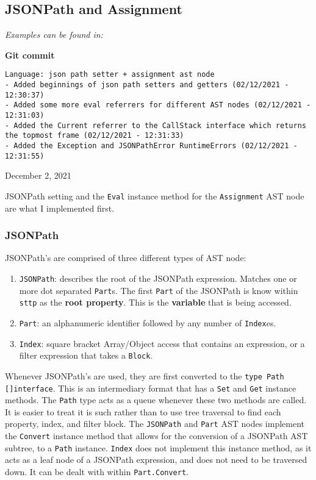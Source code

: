 \subsection{JSONPath and Assignment}

\textit{Examples can be found in: }

\begin{center}
    \textbf{Git commit}
    \begin{verbatim}
Language: json path setter + assignment ast node
- Added beginnings of json path setters and getters (02/12/2021 - 12:30:37)
- Added some more eval referrers for different AST nodes (02/12/2021 - 12:31:03)
- Added the Current referrer to the CallStack interface which returns the topmost frame (02/12/2021 - 12:31:33)
- Added the Exception and JSONPathError RuntimeErrors (02/12/2021 - 12:31:55)
    \end{verbatim}
    \vspace{-1em}
    \tiny{December 2, 2021}
\end{center}

JSONPath setting and the \verb|Eval| instance method for the \verb|Assignment| AST node are what I implemented first.

\subsubsection{JSONPath}

JSONPath's are comprised of three different types of AST node:

\begin{enumerate}
    \item \verb|JSONPath|: describes the root of the JSONPath expression. Matches one or more dot separated \verb|Part|s. The first \verb|Part| of the JSONPath is know within \verb|sttp| as the \textbf{root property}. This is the \textbf{variable} that is being accessed.
    \item \verb|Part|: an alphanumeric identifier followed by any number of \verb|Index|es.
    \item \verb|Index|: square bracket Array/Object access that contains an expression, or a filter expression that takes a \verb|Block|.
\end{enumerate}

Whenever JSONPath's are used, they are first converted to the \texttt{type Path []interface{}}. This is an intermediary format that has a \verb|Set| and \verb|Get| instance methods. The \verb|Path| type acts as a queue whenever these two methods are called. It is easier to treat it is such rather than to use tree traversal to find each property, index, and filter block. The \verb|JSONPath| and \verb|Part| AST nodes implement the \verb|Convert| instance method that allows for the conversion of a JSONPath AST subtree, to a \verb|Path| instance. \verb|Index| does not implement this instance method, as it acts as a leaf node of a JSONPath expression, and does not need to be traversed down. It can be dealt with within \verb|Part.Convert|.

